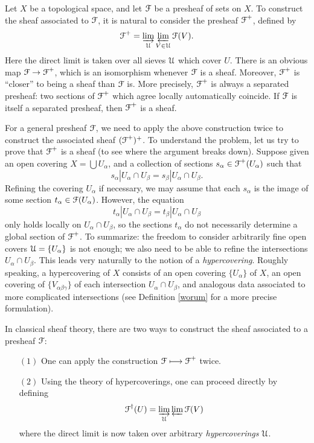Let $X$ be a topological space, and let $\operatorname{\mathcal{F}}$ be a presheaf of sets on $X$. To construct the sheaf associated to $\operatorname{\mathcal{F}}$, it is natural to consider the presheaf $\operatorname{\mathcal{F}}^{+}$, defined by
$$ \operatorname{\mathcal{F}}^{+} = \varinjlim_{ \operatorname{\mathcal{U}} } \varprojlim_{ V \in \operatorname{\mathcal{U}} } \operatorname{\mathcal{F}}(V).$$ 
Here the direct limit is taken over all sieves $\operatorname{\mathcal{U}}$ which cover $U$. There is an obvious map
$ \operatorname{\mathcal{F}} \rightarrow \operatorname{\mathcal{F}}^{+}$, which is an isomorphism whenever $\operatorname{\mathcal{F}}$ is a sheaf. Moreover, $\operatorname{\mathcal{F}}^{+}$ is ``closer'' to being a sheaf than $\operatorname{\mathcal{F}}$ is. More precisely, $\operatorname{\mathcal{F}}^{+}$ is always a separated presheaf: two sections of $\operatorname{\mathcal{F}}^{+}$ which agree locally automatically coincide.
If $\operatorname{\mathcal{F}}$ is itself a separated presheaf, then $\operatorname{\mathcal{F}}^{+}$ is a sheaf.

For a general presheaf $\operatorname{\mathcal{F}}$, we need to apply the above construction twice to construct the associated sheaf $(\operatorname{\mathcal{F}}^{+})^{+}$. To understand the problem, let us try to prove that $\operatorname{\mathcal{F}}^{+}$ is a sheaf (to see where the argument breaks down). Suppose given an open covering
$X = \bigcup U_{\alpha}$, and a collection of sections $s_{\alpha} \in \operatorname{\mathcal{F}}^{+}(U_{\alpha})$ such that
$$ s_{\alpha} | U_{\alpha} \cap U_{\beta} = s_{\beta} | U_{\alpha} \cap U_{\beta}. $$
Refining the covering $U_{\alpha}$ if necessary, we may assume that each $s_{\alpha}$
is the image of some section $t_{\alpha} \in \operatorname{\mathcal{F}}(U_{\alpha})$. However, the equation
$$ t_{\alpha} | U_{\alpha} \cap U_{\beta} = t_{\beta} | U_{\alpha} \cap U_{\beta} $$
only holds locally on $U_{\alpha} \cap U_{\beta}$, so the sections $t_{\alpha}$ do not necessarily determine a global section of $\operatorname{\mathcal{F}}^{+}$. To summarize: the freedom to consider
arbitrarily fine open covers $\operatorname{\mathcal{U}} = \{ U_{\alpha} \}$ is not enough; we also need to be able to refine the intersections $U_{\alpha} \cap U_{\beta}$. This leads very naturally to the notion of a {\it hypercovering}. Roughly speaking, a hypercovering of $X$ consists of an open covering
$\{ U_{\alpha} \}$ of $X$, an open covering of $\{ V_{\alpha\beta\gamma} \}$ of each intersection $U_{\alpha} \cap U_{\beta}$, and analogous data associated to more complicated intersections (see Definition \ref{worum} for a more precise formulation).

In classical sheaf theory, there are two ways to construct the sheaf associated to a presheaf $\operatorname{\mathcal{F}}$:
\begin{itemize}
\item[$(1)$] One can apply the construction $\operatorname{\mathcal{F}} \longmapsto \operatorname{\mathcal{F}}^{+}$ twice.
\item[$(2)$] Using the theory of hypercoverings, one can proceed directly by defining
$$\operatorname{\mathcal{F}}^{\dagger}(U) = \varinjlim_{\operatorname{\mathcal{U}}} \varprojlim \operatorname{\mathcal{F}}(V)$$
where the direct limit is now taken over arbitrary {\em hypercoverings} $\operatorname{\mathcal{U}}$.
\end{itemize}

